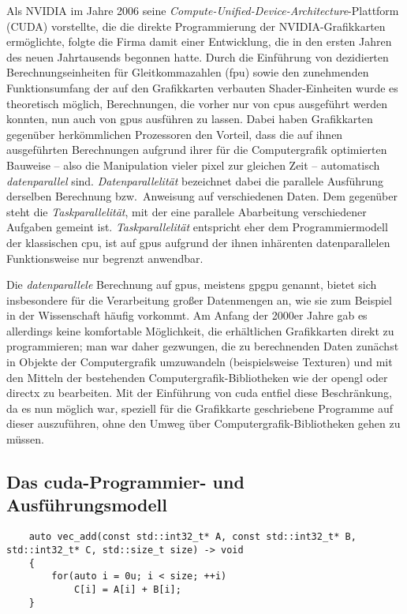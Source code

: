 Als NVIDIA{\textregistered} im Jahre 2006 seine \textit{Compute-Unified-Device-Architecture}-Plattform
(CUDA{\textregistered}) vorstellte, die die direkte Programmierung der NVIDIA{\textregistered}-Grafikkarten ermöglichte,
folgte die Firma damit einer Entwicklung, die in den ersten Jahren des neuen Jahrtausends begonnen hatte. Durch die
Einführung von dezidierten Berechnungseinheiten für Gleitkommazahlen (\gls{fpu}) sowie den zunehmenden Funktionsumfang
der auf den Grafikkarten verbauten Shader-Einheiten wurde es theoretisch möglich, Berechnungen, die vorher nur von
\gls{cpu}s ausgeführt werden konnten, nun auch von \gls{gpu}s ausführen zu lassen. Dabei haben Grafikkarten gegenüber
herkömmlichen Prozessoren den Vorteil, dass die auf ihnen ausgeführten Berechnungen aufgrund ihrer für die
Computergrafik optimierten Bauweise -- also die Manipulation vieler \gls{pixel} zur gleichen Zeit -- automatisch
\textit{datenparallel} sind. \textit{Datenparallelität} bezeichnet dabei die parallele Ausführung derselben Berechnung
bzw.\ Anweisung auf verschiedenen Daten. Dem gegenüber steht die \textit{Taskparallelität}, mit der eine parallele
Abarbeitung verschiedener Aufgaben gemeint ist. \textit{Taskparallelität} entspricht eher dem Programmiermodell der
klassischen \gls{cpu}, ist auf \gls{gpu}s aufgrund der ihnen inhärenten datenparallelen Funktionsweise nur begrenzt
anwendbar.

Die \textit{datenparallele} Berechnung auf \gls{gpu}s, meistens \gls{gpgpu} genannt, bietet sich insbesondere
für die Verarbeitung großer Datenmengen an, wie sie zum Beispiel in der Wissenschaft häufig vorkommt. Am Anfang der
2000er Jahre gab es allerdings keine komfortable Möglichkeit, die erhältlichen Grafikkarten direkt zu programmieren;
man war daher gezwungen, die zu berechnenden Daten zunächst in Objekte der Computergrafik umzuwandeln (beispielsweise 
Texturen) und mit den Mitteln der bestehenden Computergrafik-Bibliotheken wie der \gls{opengl} oder \gls{directx} zu
bearbeiten. Mit der Einführung von \gls{cuda} entfiel diese Beschränkung, da es nun möglich war, speziell für die
Grafikkarte geschriebene Programme auf dieser auszuführen, ohne den Umweg über Computergrafik-Bibliotheken gehen zu
müssen.

\subsection{Das \gls{cuda}-Programmier- und Ausführungsmodell}

\begin{verbatim}
    auto vec_add(const std::int32_t* A, const std::int32_t* B, std::int32_t* C, std::size_t size) -> void
    {
        for(auto i = 0u; i < size; ++i)
            C[i] = A[i] + B[i];
    }
\end{verbatim}

